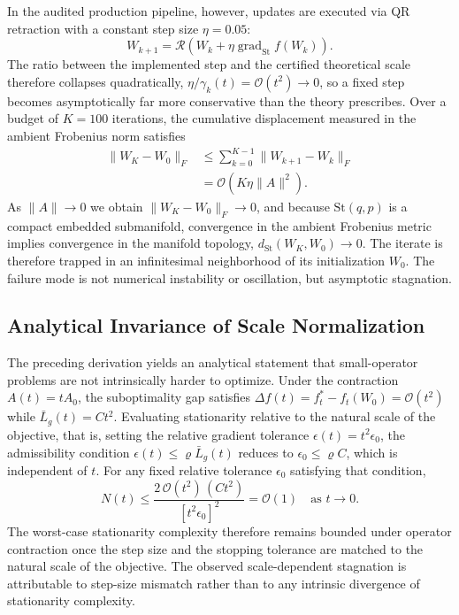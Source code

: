 \documentclass[preprint,12pt]{elsarticle}
\begin{document}
In the audited production pipeline, however, updates are executed via QR retraction with a constant step size $\eta = 0.05$:
\begin{equation}
W_{k+1} = \mathcal{R}\left( W_k + \eta \operatorname{grad}_{\mathrm{St}} f(W_k) \right).
\label{eq:qr_retract}
\end{equation}
The ratio between the implemented step and the certified theoretical scale therefore collapses quadratically, $\eta / \gamma_k(t) = \mathcal{O}(t^2) \to 0$, so a fixed step becomes asymptotically far more conservative than the theory prescribes. Over a budget of $K = 100$ iterations, the cumulative displacement measured in the ambient Frobenius norm satisfies
\begin{equation}
\begin{split}
\| W_K - W_0 \|_F &\le \sum_{k=0}^{K-1} \| W_{k+1} - W_k \|_F \\
&= \mathcal{O}(K \eta \|A\|^2).
\end{split}
\label{eq:trajectory_bound}
\end{equation}
As $\|A\| \to 0$ we obtain $\| W_K - W_0 \|_F \to 0$, and because $\mathrm{St}(q, p)$ is a compact embedded submanifold, convergence in the ambient Frobenius metric implies convergence in the manifold topology, $d_{\mathrm{St}}(W_K, W_0) \to 0$. The iterate is therefore trapped in an infinitesimal neighborhood of its initialization $W_0$. The failure mode is not numerical instability or oscillation, but asymptotic stagnation.

\subsection{Analytical Invariance of Scale Normalization}

The preceding derivation yields an analytical statement that small-operator problems are not intrinsically harder to optimize. Under the contraction $A(t) = t A_0$, the suboptimality gap satisfies $\Delta f(t) = f_t^* - f_t(W_0) = \mathcal{O}(t^2)$ while $\bar{L}_g(t) = C t^2$. Evaluating stationarity relative to the natural scale of the objective, that is, setting the relative gradient tolerance $\epsilon(t) = t^2 \epsilon_0$, the admissibility condition $\epsilon(t) \le \varrho \bar{L}_g(t)$ reduces to $\epsilon_0 \le \varrho C$, which is independent of $t$. For any fixed relative tolerance $\epsilon_0$ satisfying that condition,
\begin{equation}
N(t) \le \frac{2 \, \mathcal{O}(t^2) \, (C t^2)}{\left[ t^2 \epsilon_0 \right]^2} = \mathcal{O}(1) \quad \text{as } t \to 0.
\label{eq:complexity_invariant}
\end{equation}
The worst-case stationarity complexity therefore remains bounded under operator contraction once the step size and the stopping tolerance are matched to the natural scale of the objective. The observed scale-dependent stagnation is attributable to step-size mismatch rather than to any intrinsic divergence of stationarity complexity.
\end{document}
